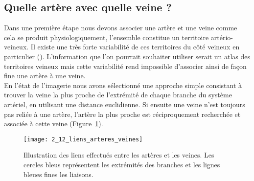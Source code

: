\subsection{Quelle artère avec quelle veine ? }
Dans une première étape nous devons associer une artère et une veine comme cela se produit physiologiquement, l’ensemble constitue un territoire artério-veineux. Il existe une très forte variabilité de ces territoires du côté veineux en particulier (\cite{Reiner2013}). L’information que l’on pourrait souhaiter utiliser serait un atlas des territoires veineux mais cette variabilité rend impossible d’associer ainsi de façon fine une artère à une veine.\\
En l’état de l’imagerie nous avons sélectionné une approche simple consistant à trouver la veine la plus proche de l’extrémité de chaque branche du système artériel, en utilisant une distance euclidienne. Si ensuite une veine n’est toujours pas reliée à une artère, l’artère la plus proche est réciproquement recherchée et associée à cette veine (Figure~\ref{fig:2_12_liens_arteres_veines}).
\begin{figure}[!t]
\centering
\texttt{[image: 2\_12\_liens\_arteres\_veines]}
\caption{Illustration des liens effectués entre les artères et les veines. Les cercles bleus représentent les extrémités des branches et les lignes bleues fines les liaisons.}
\label{fig:2_12_liens_arteres_veines}	
\end{figure}	
